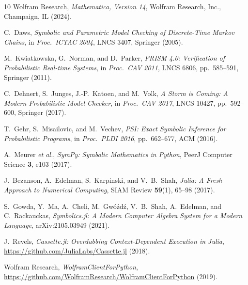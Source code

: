 \documentclass[twocolumn,10pt]{article}
\begin{document}
\begin{thebibliography}{10}
Wolfram Research,
\textit{Mathematica, Version 14},
Wolfram Research, Inc., Champaign, IL (2024).

C.~Daws,
\textit{Symbolic and Parametric Model Checking of Discrete-Time Markov
  Chains},
in \textit{Proc.\ ICTAC 2004}, LNCS 3407, Springer (2005).

M.~Kwiatkowska, G.~Norman, and D.~Parker,
\textit{PRISM 4.0: Verification of Probabilistic Real-time Systems},
in \textit{Proc.\ CAV 2011}, LNCS 6806, pp.~585--591, Springer (2011).

C.~Dehnert, S.~Junges, J.-P.~Katoen, and M.~Volk,
\textit{A Storm is Coming: A Modern Probabilistic Model Checker},
in \textit{Proc.\ CAV 2017}, LNCS 10427, pp.~592--600, Springer (2017).

T.~Gehr, S.~Misailovic, and M.~Vechev,
\textit{PSI: Exact Symbolic Inference for Probabilistic Programs},
in \textit{Proc.\ PLDI 2016}, pp.~662--677, ACM (2016).

A.~Meurer \textit{et al.},
\textit{SymPy: Symbolic Mathematics in Python},
PeerJ Computer Science \textbf{3}, e103 (2017).

J.~Bezanson, A.~Edelman, S.~Karpinski, and V.~B.~Shah,
\textit{Julia: A Fresh Approach to Numerical Computing},
SIAM Review \textbf{59}(1), 65--98 (2017).

S.~Gowda, Y.~Ma, A.~Cheli, M.~Gw\'{o}\'{z}d\'{z}, V.~B.~Shah,
A.~Edelman, and C.~Rackauckas,
\textit{Symbolics.jl: A Modern Computer Algebra System for a Modern
  Language},
arXiv:2105.03949 (2021).

J.~Revels,
\textit{Cassette.jl: Overdubbing Context-Dependent Execution in Julia},
\url{https://github.com/JuliaLabs/Cassette.jl} (2018).

Wolfram Research,
\textit{WolframClientForPython},
\url{https://github.com/WolframResearch/WolframClientForPython} (2019).

\end{thebibliography}
\end{document}
